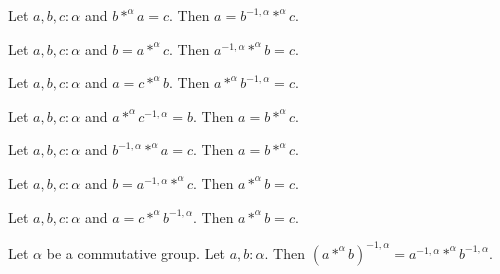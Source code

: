 \documentclass[english]{article}
\begin{document}
\begin{forthel}
\begin{lemma}[title=eq inv mul of mul eq]
Let $a,b,c : \alpha$ and $b *^{\alpha} a = c$.
Then $a = b^{-1,\alpha} *^{\alpha} c$.
\end{lemma}

\begin{lemma}[title=inv mul eq of eq mul]
Let $a,b,c : \alpha$ and $b = a *^{\alpha} c$.
Then $a^{-1,\alpha} *^{\alpha} b = c$.
\end{lemma}

\begin{lemma}[title=mul inv eq of eq mul]
Let $a,b,c : \alpha$ and $a = c *^{\alpha} b$.
Then $a *^{\alpha} b^{-1,\alpha} = c$.
\end{lemma}

\begin{lemma}[title=eq mul of mul inv eq]
Let $a,b,c : \alpha$ and $a *^{\alpha} c^{-1,\alpha} = b$.
Then $a = b *^{\alpha} c$.
\end{lemma}

\begin{lemma}[title=eq mul of inv mul eq]
Let $a,b,c : \alpha$ and $b^{-1,\alpha} *^{\alpha} a = c$.
Then $a = b *^{\alpha} c$.
\end{lemma}

\begin{lemma}[title=mul eq of eq inv mul]
Let $a,b,c : \alpha$ and $b = a^{-1,\alpha} *^{\alpha} c$.
Then $a *^{\alpha} b = c$.
\end{lemma}

\begin{lemma}[title=mul eq of eq mul inv]
Let $a,b,c : \alpha$ and $a = c *^{\alpha} b^{-1,\alpha}$.
Then $a *^{\alpha} b = c$.
\end{lemma}

\begin{lemma}[title=mul inv]
Let $\alpha$ be a commutative group.
Let $a,b : \alpha$.
Then $(a *^{\alpha} b)^{-1,\alpha} = a^{-1,\alpha} *^{\alpha} b^{-1,\alpha}$.
\end{lemma}

\end{forthel}
\end{document}
